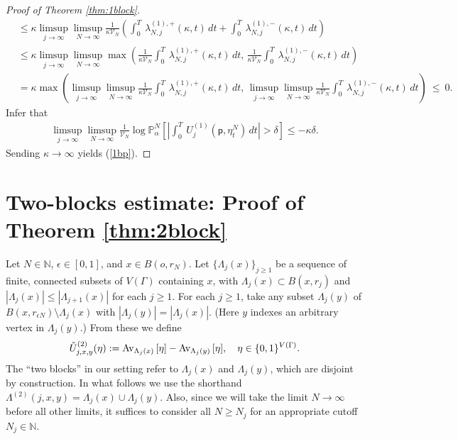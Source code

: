\documentclass[11pt]{amsart}
\theoremstyle{plain}
\theoremstyle{definition}
\theoremstyle{remark}
\begin{document}
\begin{proof}[Proof of Theorem \ref{thm:1block}]
\begin{align*}
\nonumber & \leq  \kappa \limsup_{j\to\infty} \limsup_{N\to\infty}\frac{1}{\kappa \mathcal{V}_N}\left(\int_0^T \, \lambda^{(1),+}_{N,j}(\kappa,t) \,dt  +  \int_0^T \, \lambda^{(1),-}_{N,j}(\kappa,t) \,dt \right)  \\
\nonumber & \leq  \kappa \limsup_{j\to\infty} \limsup_{N\to\infty}\max\left(\frac{1}{\kappa  \mathcal{V}_N}\int_0^T \, \lambda^{(1),+}_{N,j}(\kappa,t) \,dt, \,  \frac{1}{\kappa  \mathcal{V}_N}  \int_0^T \, \lambda^{(1),-}_{N,j}(\kappa,t) \,dt \right)\\
\nonumber & =  \kappa \max\left(\limsup_{j\to\infty} \limsup_{N\to\infty}\frac{1}{\kappa  \mathcal{V}_N}\int_0^T \, \lambda^{(1),+}_{N,j}(\kappa,t) \,dt, \, \limsup_{j\to\infty} \limsup_{N\to\infty} \frac{1}{\kappa  \mathcal{V}_N}  \int_0^T \, \lambda^{(1),-}_{N,j}(\kappa,t) \,dt \right) ~\leq~ 0.
\end{align*}
Infer that
\begin{align*}
\limsup_{j\to\infty} \limsup_{N\to\infty} \frac{1}{\mathcal{V}_N} \log \mathbb{P}^N_{\alpha}\left[\left|\int_0^T\, {U^{(1)}_{{{j}}}}({\mathsf{p}},\eta^N_t)\,dt\right| >\delta \right] \leq -\kappa \delta.
\end{align*}
Sending $\kappa\to\infty$ yields (\ref{1bp}).
\end{proof}

\section{Two-blocks estimate: Proof of Theorem \ref{thm:2block}} \label{sec:2blocks}

Let $N \in \mathbb{N}$, $\epsilon\in [0,1]$, and $x\in B(o,r_N)$. Let $\{\Lambda_j(x)\}_{j \geq 1}$ be a sequence of finite, connected subsets of $V(\Gamma)$ containing $x$, with $\Lambda_j(x) \subset B(x, r_j)$ and $|\Lambda_j(x)|\leq |\Lambda_{j+1}(x)|$ for each $j\geq 1$. For each $j\geq 1$, take any subset $\Lambda_j(y)$ of $B(x, r_{\epsilon N}) \setminus \Lambda_j(x)$ with $|\Lambda_j(y)| = |\Lambda_j(x)|$. (Here $y$ indexes an arbitrary vertex in $\Lambda_j(y)$.) From these we define
\begin{align}
\label{Utildetwo}
{\tilde{U}^{(2)}_{{{j}},{{x}},{{y}}}}(\eta) := {{\rm Av}_{{\Lambda_j(x)}}\left[{{\eta}}\right]} - {{\rm Av}_{{\Lambda_j(y)}}\left[{{\eta}}\right]}, \quad \eta\in \{0,1\}^{V(\Gamma)}.
\end{align}
The ``two blocks'' in our setting refer to $\Lambda_j(x)$ and $\Lambda_j(y)$, which are disjoint by construction. In what follows we use the shorthand $\Lambda^{(2)}(j,x,y) = \Lambda_j(x) \cup \Lambda_j(y)$. Also, since we will take the limit $N\to\infty$ before all other limits, it suffices to consider all $N\geq N_j$ for an appropriate cutoff $N_j \in \mathbb{N}$.
\end{document}
